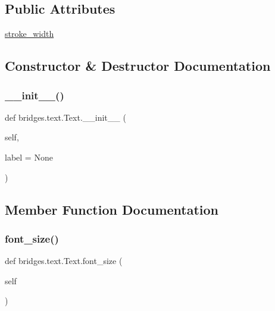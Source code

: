 \subsection*{Public Attributes}
\begin{DoxyCompactItemize}
\item 
\hyperlink{classbridges_1_1text_1_1_text_a4664e061e917f1670458e435a3dafb79}{stroke\+\_\+width}
\end{DoxyCompactItemize}


\subsection{Constructor \& Destructor Documentation}
\mbox{\label{classbridges_1_1text_1_1_text_a730885d64034a8267dc3025b4df49646}} 
\subsubsection{\texorpdfstring{\+\_\+\+\_\+init\+\_\+\+\_\+()}{\_\_init\_\_()}}
{\footnotesize\ttfamily def bridges.\+text.\+Text.\+\_\+\+\_\+init\+\_\+\+\_\+ (\begin{DoxyParamCaption}\item[{}]{self,  }\item[{}]{label = {\ttfamily None} }\end{DoxyParamCaption})}



\subsection{Member Function Documentation}
\mbox{\label{classbridges_1_1text_1_1_text_ad2a6dafe36a688451361e73c4958fd82}} 
\subsubsection{\texorpdfstring{font\+\_\+size()}{font\_size()}\hspace{0.1cm}{\footnotesize\ttfamily [1/2]}}
{\footnotesize\ttfamily def bridges.\+text.\+Text.\+font\+\_\+size (\begin{DoxyParamCaption}\item[{}]{self }\end{DoxyParamCaption})}


